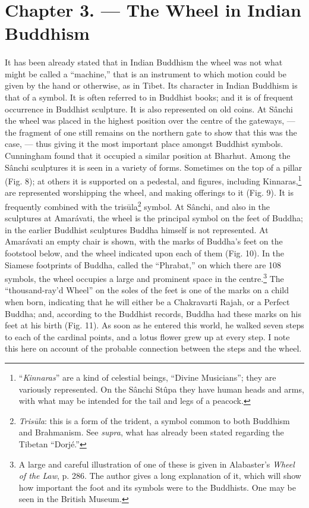 \documentclass[a4paper, 11pt, oneside, polutonikogreek, english]{article}
\begin{document}
\section{Chapter 3. --- The Wheel in Indian Buddhism}
\paragraph{}
It has been already stated that in Indian Buddhism the wheel was not what might be called a ``machine,'' that is an instrument to which motion could be given by the hand or otherwise, as in Tibet. Its character in Indian Buddhism is that of a symbol. It is often referred to in Buddhist books; and it is of frequent occurrence in Buddhist sculpture. It is also represented on old coins. At Sânchi the wheel was placed in the highest position over the centre of the gateways, --- the fragment of one still remains on the northern gate to show that this was the case, --- thus giving it the most important place amongst Buddhist symbols. Cunningham found that it occupied a similar position at Bharhut. Among the Sânchi sculptures it is seen in a variety of forms. Sometimes on the top of a pillar (Fig. 8); at others it is supported on a pedestal, and figures, including Kinnaras,\footnote{``\emph{Kinnaras}'' are a kind of celestial beings, ``Divine Musicians''; they are variously represented. On the Sânchi Stûpa they have human heads and arms, with what may be intended for the tail and legs of a peacock.} are represented worshipping the wheel, and making offerings to it (Fig. 9). It is frequently combined with the trisūla\footnote{\emph{Trisūla}: this is a form of the trident, a symbol common to both Buddhism and Brahmanism. See \emph{supra}, what has already been stated  regarding the Tibetan ``Dorjé.''} symbol. At Sânchi, and also in the sculptures at Amarávati, the wheel is the principal symbol on the feet of Buddha; in the earlier Buddhist sculptures Buddha himself is not represented. At Amarávati an empty chair is shown, with the marks of Buddha's feet on the footstool below, and the wheel indicated upon each of them (Fig. 10). In the Siamese footprints of Buddha, called the ``Phrabat,'' on which there are 108 symbols, the wheel occupies a large and prominent space in the centre.\footnote{A large and careful illustration of one of these is given in Alabaster's \emph{Wheel of the Law}, p. 286. The author gives a long explanation of it, which will show how important the foot and its symbols were to the Buddhists. One may be seen in the British Museum.} The ``thousand-ray'd Wheel'' on the soles of the feet is one of the marks on a child when born, indicating that he will either be a Chakravarti Rajah, or a Perfect Buddha; and, according to the Buddhist records, Buddha had these marks on his feet at his birth (Fig. 11). As soon as he entered this world, he walked seven steps to each of the cardinal points, and a lotus flower grew up at every step. I note this here on account of the probable connection between the steps and the wheel.
\end{document}
